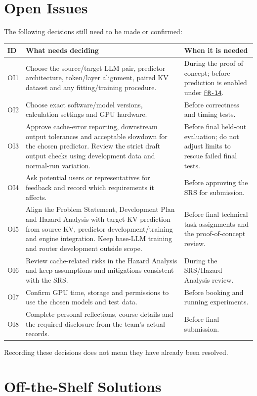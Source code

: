 \documentclass[12pt]{article}
\begin{document}
\section{Open Issues}
\label{sec:open}
The following decisions still need to be made or confirmed:
\begin{longtable}{@{}p{}p{}p{}@{}}
\toprule ID & What needs deciding & When it is needed\\\midrule\endhead
OI1 & Choose the source/target LLM pair, predictor architecture, token/layer alignment, paired KV dataset and any fitting/training procedure. & During the proof of concept; before prediction is enabled under \hyperref[req:FR-14]{\texttt{FR-14}}.\\
OI2 & Choose exact software/model versions, calculation settings and GPU hardware. & Before correctness and timing tests.\\
OI3 & Approve cache-error reporting, downstream output tolerances and acceptable slowdown for the chosen predictor. Review the strict draft output checks using development data and normal-run variation. & Before final held-out evaluation; do not adjust limits to rescue failed final tests.\\
OI4 & Ask potential users or representatives for feedback and record which requirements it affects. & Before approving the SRS for submission.\\
OI5 & Align the Problem Statement, Development Plan and Hazard Analysis with target-KV prediction from source KV, predictor development/training and engine integration. Keep base-LLM training and router development outside scope. & Before final technical task assignments and the proof-of-concept review.\\
OI6 & Review cache-related risks in the Hazard Analysis and keep assumptions and mitigations consistent with the SRS. & During the SRS/Hazard Analysis review.\\
OI7 & Confirm GPU time, storage and permissions to use the chosen models and test data. & Before booking and running experiments.\\
OI8 & Complete personal reflections, course details and the required disclosure from the team's actual records. & Before final submission.\\
\bottomrule
\end{longtable}
Recording these decisions does not mean they have already been resolved.

\section{Off-the-Shelf Solutions}
\end{document}
